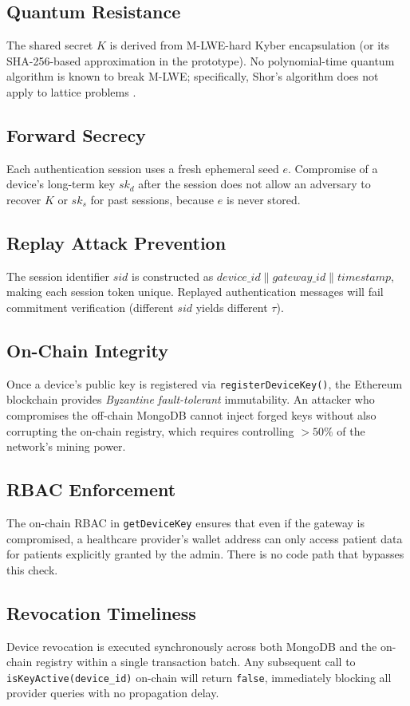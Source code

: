 \documentclass[conference]{IEEEtran}
\begin{document}
\subsection{Quantum Resistance}
The shared secret $K$ is derived from M-LWE-hard Kyber encapsulation (or its
SHA-256-based approximation in the prototype). No polynomial-time quantum algorithm
is known to break M-LWE; specifically, Shor's algorithm does not apply to lattice
problems \cite{nist_pqc}.

\subsection{Forward Secrecy}
Each authentication session uses a fresh ephemeral seed $e$. Compromise of a device's
long-term key $sk_d$ after the session does not allow an adversary to recover $K$ or
$sk_s$ for past sessions, because $e$ is never stored.

\subsection{Replay Attack Prevention}
The session identifier $\mathit{sid}$ is constructed as
$\mathit{device\_id} \| \mathit{gateway\_id} \| \mathit{timestamp}$, making each
session token unique. Replayed authentication messages will fail commitment verification
(different $\mathit{sid}$ yields different $\tau$).

\subsection{On-Chain Integrity}
Once a device's public key is registered via \texttt{registerDeviceKey()}, the
Ethereum blockchain provides \emph{Byzantine fault-tolerant} immutability. An attacker
who compromises the off-chain MongoDB cannot inject forged keys without also corrupting
the on-chain registry, which requires controlling $>50\%$ of the network's mining power.

\subsection{RBAC Enforcement}
The on-chain RBAC in \texttt{getDeviceKey} ensures that even if the gateway is
compromised, a healthcare provider's wallet address can only access patient data for
patients explicitly granted by the admin. There is no code path that bypasses this
check.

\subsection{Revocation Timeliness}
Device revocation is executed synchronously across both MongoDB and the on-chain
registry within a single transaction batch. Any subsequent call to
\texttt{isKeyActive(device\_id)} on-chain will return \texttt{false}, immediately
blocking all provider queries with no propagation delay.
\end{document}
